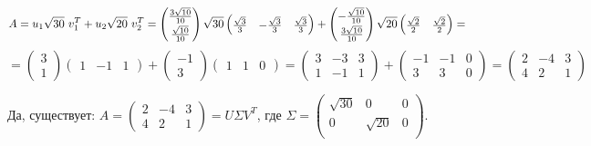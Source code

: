 \[
    A = u_1 \sqrt{30}\  v_1^T + u_2 \sqrt{20}\  v_2^T =
    \begin{pmatrix}
        \frac{3 \sqrt{10}}{10} \\[0.7mm]
        \frac{\sqrt{10}}{10}
    \end{pmatrix}
    \sqrt{30}
    \begin{pmatrix}
        \frac{\sqrt{3}}{3} & -\frac{\sqrt{3}}{3} & \frac{\sqrt{3}}{3}
    \end{pmatrix}
    +
    \begin{pmatrix}
        -\frac{\sqrt{10}}{10} \\[0.7mm]
        \frac{3 \sqrt{10}}{10}
    \end{pmatrix}
    \sqrt{20}
    \begin{pmatrix}
        \frac{\sqrt{2}}{2} & \frac{\sqrt{2}}{2}
    \end{pmatrix}
    =
\]
\[
    =
    \begin{pmatrix}
        3 \\
        1
    \end{pmatrix}
    \begin{pmatrix}
        1 & -1 & 1
    \end{pmatrix}
    +
    \begin{pmatrix}
        -1 \\
        3
    \end{pmatrix}
    \begin{pmatrix}
        1 & 1 & 0
    \end{pmatrix}
    =
    \begin{pmatrix}
        3 & -3 & 3 \\
        1 & -1 & 1
    \end{pmatrix}
    +
    \begin{pmatrix}
        -1 & -1 & 0 \\
        3  & 3  & 0
    \end{pmatrix}
    =
    \begin{pmatrix}
        2 & -4 & 3 \\
        4 & 2  & 1
    \end{pmatrix}
\]

Да, существует:
$
    A =
    \begin{pmatrix}
        2 & -4 & 3 \\
        4 & 2  & 1
    \end{pmatrix}
    =
    U \Sigma V^T
$, где
$
    \Sigma =
    \begin{pmatrix}
        \sqrt{30} & 0         & 0 \\
        0         & \sqrt{20} & 0 \\
    \end{pmatrix}
$.
